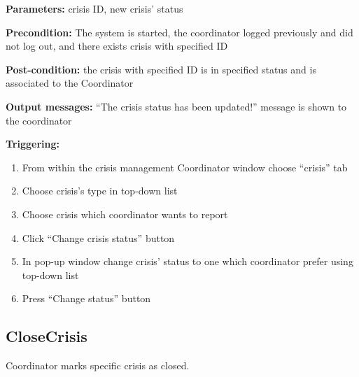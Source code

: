 \begin{description}

\item \textbf{Parameters:} crisis ID, new crisis' status
\item \textbf{Precondition:} The system is started, the coordinator logged
previously and did not log out, and there exists crisis with specified ID
\item \textbf{Post-condition:} the crisis with specified ID is in specified
status and is associated to the Coordinator
\item \textbf{Output messages:} ``The crisis status has been updated!'' message
is shown to the coordinator

\item \textbf{Triggering:}
\begin{enumerate}
\item From within the crisis management Coordinator window choose ``crisis'' tab
\item Choose crisis's type in top-down list
\item Choose crisis which coordinator wants to report
\item Click ``Change crisis status'' button
\item In pop-up window change crisis' status to one which coordinator prefer
using top-down list
\item Press ``Change status'' button
\end{enumerate}

\end{description}

\subsection{CloseCrisis}

Coordinator marks specific crisis as closed. 

